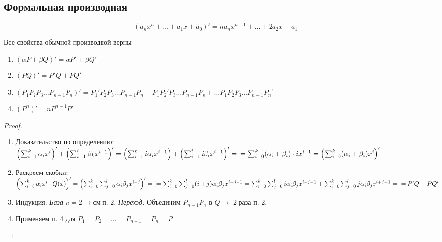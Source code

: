 \subsection{Формальная производная}
\begin{definition}
    \[(a_nx^n + \dots + a_1x + a_0)' = na_nx^{n-1} + \dots + 2a_2x + a_1\]
\end{definition}
\begin{note}
    Все свойства обычной производной верны
    \begin{enumerate}
        \item \((\alpha P + \beta Q)' = \alpha P' + \beta Q'\)
        \item \((PQ)' = P'Q + PQ'\)
        \item \(\left(P_1 P_2 P_3 \dots P_{n-1} P_n\right)' = P_1' P_2 P_3 \dots P_{n-1} P_n + P_1 P_2' P_3 \dots P_{n-1} P_n + \dots P_1 P_2 P_3 \dots P_{n-1} P_n' \) 
        \item \((P^n)' = nP^{n-1}P'\)
    \end{enumerate}
    \begin{proof}
        \begin{enumerate}
            \item Доказательство по определению: \\ \(\left(\sum_{i = 1}^k \alpha_i x^i\right)' + \left(\sum_{i = 1}^i \beta_k x^{i - 1}\right)' = \left(\sum_{i = 1}^k i \alpha_i x^{i - 1}\right) + \left(\sum_{i = 1}^i i \beta_i x^{i - 1}\right)' = \\ = \sum_{i = 0}^k (\alpha_i + \beta_i) \cdot i x^{i - 1} = \left(\sum_{i = 0}^k (\alpha_i + \beta_i) x^i\right)'\)
            \item Раскроем скобки:
            \(\left(\sum_{i = 0}^k \alpha_i x^i \cdot Q(x)\right)' = \left(\sum_{i = 0}^k \sum_{j = 0}^l \alpha_i \beta_j x^{i + j}\right)' = \\ = \sum_{i = 0}^k \sum_{j = 0}^l (i + j)\alpha_i \beta_j x^{i + j - 1} = \sum_{i = 0}^k \sum_{j = 0}^l i \alpha_i \beta_j x^{i + j - 1} + \sum_{i = 0}^k \sum_{j = 0}^l j \alpha_i \beta_j x^{i + j - 1} = \\ = P'Q + PQ'\)
            \item Индукция: \textit{База} $n = 2 \to \text{см п. 2}$. \textit{Переход:} Объединим $P_{n-1}P_n$ в $Q \to$ 2 раза п. 2.
            \item Применяем п. 4 для $P_1 = P_2 = \dots = P_{n-1} = P_n = P$
        \end{enumerate}
    \end{proof}
\end{note}
